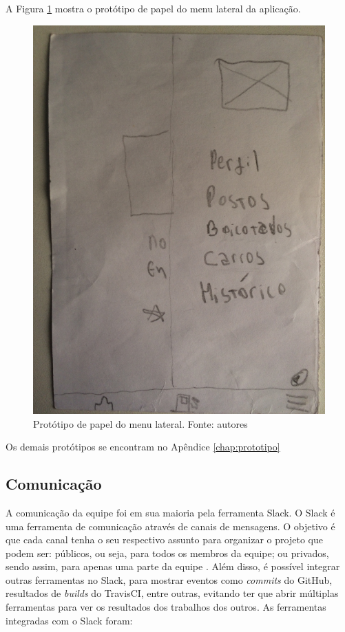 A Figura \ref{img:prototipo_de_papel_menu_lateral} mostra o protótipo de papel do menu lateral da aplicação.
\begin{figure}[H]
    \centering
    \includegraphics[scale=0.05, angle=-90]{figuras/prototipo_papel_menu.jpg}
    \caption[Protótipo de papel do menu lateral]{Protótipo de papel do menu lateral. Fonte: autores}
    \label{img:prototipo_de_papel_menu_lateral}
\end{figure}

Os demais protótipos se encontram no Apêndice \ref{chap:prototipo}

\subsection{Comunicação}

A comunicação da equipe foi em sua maioria pela ferramenta Slack. O Slack é uma ferramenta de comunicação através de canais de mensagens. O objetivo é que cada canal tenha o seu respectivo assunto para organizar o projeto que podem ser: públicos, ou seja, para todos os membros da equipe; ou privados, sendo assim, para apenas uma parte da equipe \cite{slack}. Além disso, é possível integrar outras ferramentas no Slack, para mostrar eventos como \textit{commits} do GitHub, resultados de \textit{builds} do TravisCI, entre outras, evitando ter que abrir múltiplas ferramentas para ver os resultados dos trabalhos dos outros. As ferramentas integradas com o Slack foram:


